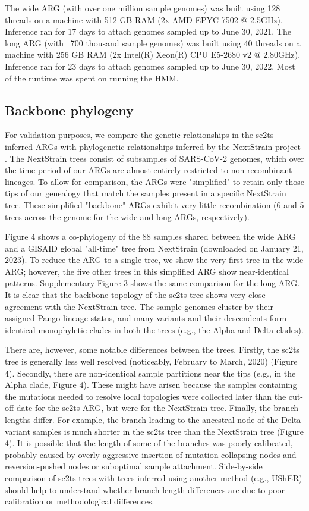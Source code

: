 \documentclass{article}
\begin{document}
The wide ARG (with over one million sample genomes) was built using 128 threads
on a machine with 512 GB RAM (2x AMD EPYC 7502 @ 2.5GHz). Inference ran for 17
days to attach genomes sampled up to June 30, 2021. The long ARG (with ~700
thousand sample genomes) was built using 40 threads on a machine with 256 GB
RAM (2x Intel(R) Xeon(R) CPU E5-2680 v2 @ 2.80GHz). Inference ran for 23 days
to attach genomes sampled up to June 30, 2022. Most of the runtime was spent on
running the HMM.

\subsection{Backbone phylogeny}

For validation purposes, we compare the genetic relationships in the
sc2ts-inferred ARGs with phylogenetic relationships inferred by the NextStrain
project \cite{Hadfield2018-ef}. The NextStrain trees consist of subsamples of
SARS-CoV-2 genomes, which over the time period of our ARGs are almost entirely
restricted to non-recombinant lineages. To allow for comparison, the ARGs were
"simplified" \cite{Kelleher2018-xc} to retain only those tips of our genealogy
that match the samples present in a specific NextStrain tree. These simplified
"backbone" ARGs exhibit very little recombination (6 and 5 trees across the
genome for the wide and long ARGs, respectively).

Figure 4 shows a co-phylogeny of the 88 samples shared between the wide ARG and
a GISAID global "all-time" tree from NextStrain (downloaded on January 21,
2023). To reduce the ARG to a single tree, we show the very first tree in the
wide ARG; however, the five other trees in this simplified ARG show
near-identical patterns. Supplementary Figure 3 shows the same comparison for
the long ARG. It is clear that the backbone topology of the sc2ts tree shows
very close agreement with the NextStrain tree. The sample genomes cluster by
their assigned Pango lineage status, and many variants and their descendents
form identical monophyletic clades in both the trees (e.g., the Alpha and Delta
clades).

There are, however, some notable differences between the trees. Firstly, the
sc2ts tree is generally less well resolved (noticeably, February to March,
2020) (Figure 4). Secondly, there are non-identical sample partitions near the
tips (e.g., in the Alpha clade, Figure 4). These might have arisen because the
samples containing the mutations needed to resolve local topologies were
collected later than the cut-off date for the sc2ts ARG, but were for the
NextStrain tree. Finally, the branch lengths differ. For example, the branch
leading to the ancestral node of the Delta variant samples is much shorter in
the sc2ts tree than the NextStrain tree (Figure 4). It is possible that the
length of some of the branches was poorly calibrated, probably caused by overly
aggressive insertion of mutation-collapsing nodes and reversion-pushed nodes or
suboptimal sample attachment. Side-by-side comparison of sc2ts trees with trees
inferred using another method (e.g., UShER) should help to understand whether
branch length differences are due to poor calibration or methodological
differences.
\end{document}
